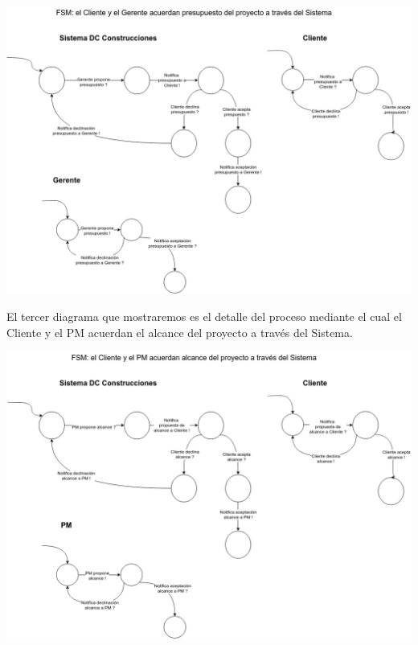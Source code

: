 \begin{center}
\includegraphics[scale=0.5, angle=90]{imagenes/FSM2.png}
\end{center}

\newpage
El tercer diagrama que mostraremos es el detalle del proceso mediante el cual el Cliente y el PM acuerdan el alcance del proyecto a través del Sistema.

\begin{center}
\includegraphics[scale=0.5, angle=90]{imagenes/FSM3.png}
\end{center}
